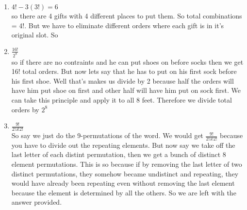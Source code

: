 \documentclass[11pt]{article}
\begin{document}
\begin{enumerate}
\item $4!-3(3!)=6$ \\so there are 4 gifts with 4 different places to put them. So total combinations = 4!. But we have to eliminate different orders where each gift is in it's original slot. So 

\item $\frac{16!}{2^{8}}$ \\ so if there are no contraints and he can put shoes on before socks then we get 16! total orders. But now lets say that he has to put on his first sock before his first shoe. Well that's makes us divide by 2 because half the orders will have him put shoe on first and other half will have him put on sock first. We can take this principle and apply it to all 8 feet. Therefore we divide total orders by $2^{8}$

\item $\frac{9!}{2!3!2!}$ \\ So say we just do the 9-permutations of the word. We would get $\frac{9!}{2!3!2!}$ because you have to divide out the repeating elements. But now say we take off the last letter of each distint permutation, then we get a bunch of distinct 8 element permutations. This is so because if by removing the last letter of two distinct permutations, they somehow became undistinct and repeating, they would have already been repeating even without removing the last element because the element is determined by all the others. So we are left with the answer provided.

\end{enumerate}
\end{document}
